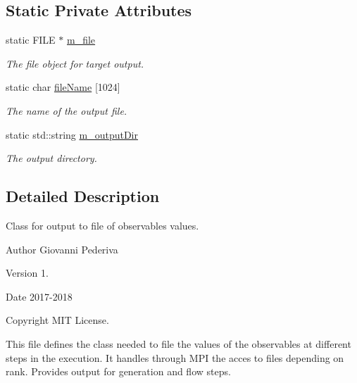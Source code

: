 \subsection*{Static Private Attributes}
\begin{DoxyCompactItemize}
\item 
static F\+I\+LE $\ast$ \hyperlink{classLatticeIO_1_1OutputObs_ad725efe02bfef0f70ef2a43722ce041d}{m\+\_\+file}\hypertarget{classLatticeIO_1_1OutputObs_ad725efe02bfef0f70ef2a43722ce041d}{}\label{classLatticeIO_1_1OutputObs_ad725efe02bfef0f70ef2a43722ce041d}

\begin{DoxyCompactList}\small\item\em The file object for target output. \end{DoxyCompactList}\item 
static char \hyperlink{classLatticeIO_1_1OutputObs_a451f0e835e3dfe2fc70cf779b73aae5d}{file\+Name} \mbox{[}1024\mbox{]}\hypertarget{classLatticeIO_1_1OutputObs_a451f0e835e3dfe2fc70cf779b73aae5d}{}\label{classLatticeIO_1_1OutputObs_a451f0e835e3dfe2fc70cf779b73aae5d}

\begin{DoxyCompactList}\small\item\em The name of the output file. \end{DoxyCompactList}\item 
static std\+::string \hyperlink{classLatticeIO_1_1OutputObs_a3ec9162c9ca9ddae173a1facbaa64a3a}{m\+\_\+output\+Dir}\hypertarget{classLatticeIO_1_1OutputObs_a3ec9162c9ca9ddae173a1facbaa64a3a}{}\label{classLatticeIO_1_1OutputObs_a3ec9162c9ca9ddae173a1facbaa64a3a}

\begin{DoxyCompactList}\small\item\em The output directory. \end{DoxyCompactList}\end{DoxyCompactItemize}


\subsection{Detailed Description}
Class for output to file of observables values. 

\begin{DoxyAuthor}{Author}
Giovanni Pederiva 
\end{DoxyAuthor}
\begin{DoxyVersion}{Version}
1. 
\end{DoxyVersion}
\begin{DoxyDate}{Date}
2017-\/2018 
\end{DoxyDate}
\begin{DoxyCopyright}{Copyright}
M\+IT License.
\end{DoxyCopyright}
This file defines the class needed to file the values of the observables at different steps in the execution. It handles through M\+PI the acces to files depending on rank. Provides output for generation and flow steps. 

